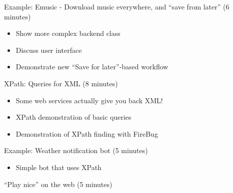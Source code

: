 \documentclass[10pt,a4paper,english]{article}
\begin{document}
\setcounter{listcnt0}{0}
\begin{list}{.}
{
\addtocounter{listcnt0}{12}
\setlength{\rightmargin}{\leftmargin}
}
\item {} 
Example: Emusic - Download music everywhere, and ``save from later'' (6 minutes)

\end{list}
\begin{itemize}
\item {} 
Show more complex backend class

\item {} 
Discuss user interface

\item {} 
Demonstrate new ``Save for later''-based workflow

\end{itemize}
\setcounter{listcnt0}{0}
\begin{list}{.}
{
\addtocounter{listcnt0}{13}
\setlength{\rightmargin}{\leftmargin}
}
\item {} 
XPath: Queries for XML (8 minutes)

\end{list}
\begin{itemize}
\item {} 
Some web services actually give you back XML!

\item {} 
XPath demonstration of basic queries

\item {} 
Demonstration of XPath finding with FireBug

\end{itemize}
\setcounter{listcnt0}{0}
\begin{list}{.}
{
\addtocounter{listcnt0}{14}
\setlength{\rightmargin}{\leftmargin}
}
\item {} 
Example: Weather notification bot (5 minutes)

\end{list}
\begin{itemize}
\item {} 
Simple bot that uses XPath

\end{itemize}
\setcounter{listcnt0}{0}
\begin{list}{.}
{
\addtocounter{listcnt0}{15}
\setlength{\rightmargin}{\leftmargin}
}
\item {} 
``Play nice'' on the web (5 minutes)

\end{list}
\end{document}
